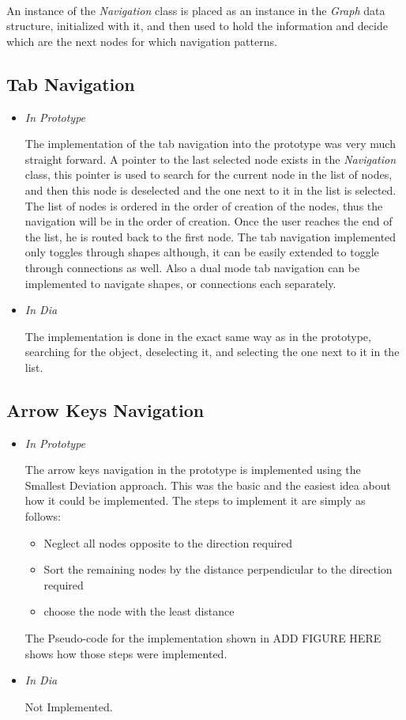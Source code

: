 \paragraph{}
An instance of the {\it Navigation} class is placed as an instance in the {\it Graph} data structure, initialized with it, and then used to hold the information and decide which are the next nodes for which navigation patterns.


\subsection{Tab Navigation}
\begin{itemize}
\item {\it In Prototype}
\par \noindent
The implementation of the tab navigation into the prototype was very much straight forward. A pointer to the last selected node exists in the {\it Navigation} class, this pointer is used to search for the current node in the list of nodes, and then this node is deselected and the one next to it in the list is selected. The list of nodes is ordered in the order of creation of the nodes, thus the navigation will be in the order of creation. Once the user reaches the end of the list, he is routed back to the first node. The tab navigation implemented only toggles through shapes although, it can be easily extended to toggle through connections as well. Also a dual mode tab navigation can be implemented to navigate shapes, or connections each separately.

\item {\it In Dia}
\par \noindent
The implementation is done in the exact same way as in the prototype, searching for the object, deselecting it, and selecting the one next to it in the list.
\end{itemize}


\subsection{Arrow Keys Navigation}
\begin{itemize}
\item {\it In Prototype}
\par \noindent
The arrow keys navigation in the prototype is implemented using the Smallest Deviation approach. This was the basic and the easiest idea about how it could be implemented.
The steps to implement it are simply as follows:
\begin{itemize}
\item Neglect all nodes opposite to the direction required
\item Sort the remaining nodes by the distance perpendicular to the direction required
\item choose the node with the least distance
\end{itemize}
The Pseudo-code for the implementation shown in ADD FIGURE HERE shows how those steps were implemented.

\item {\it In Dia}
\par \noindent
Not Implemented.
\end{itemize}

